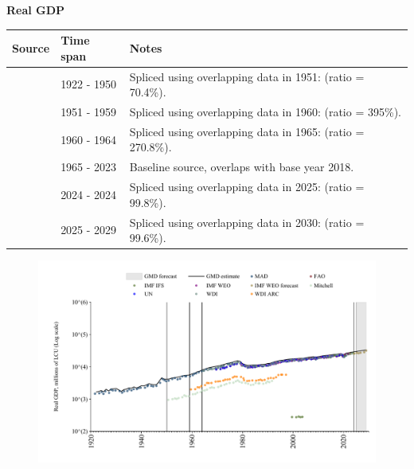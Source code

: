 \documentclass[12pt,a4paper,landscape]{article}
\begin{document}
\begin{adjustbox}{max totalsize={\paperwidth}{\paperheight},center}
\begin{minipage}[t][\textheight][t]{\textwidth}
\vspace*{0.5cm}
{}
\begin{center}
{\Large\bfseries Real GDP}
\end{center}
\vspace{0.5cm}
\begin{table}[H]
\centering
\small
\begin{tabular}{|l|l|l|}
\hline
\textbf{Source} & \textbf{Time span} & \textbf{Notes} \\
\hline
\rowcolor{white}\cite{MAD}& 1922 - 1950 &Spliced using overlapping data in 1951: (ratio = 70.4\%). \\
\rowcolor{lightgray}\cite{Mitchell}& 1951 - 1959 &Spliced using overlapping data in 1960: (ratio = 395\%). \\
\rowcolor{white}\cite{WDI_ARC}& 1960 - 1964 &Spliced using overlapping data in 1965: (ratio = 270.8\%). \\
\rowcolor{lightgray}\cite{WDI}& 1965 - 2023 &Baseline source, overlaps with base year 2018. \\
\rowcolor{white}\cite{IMF_IFS}& 2024 - 2024 &Spliced using overlapping data in 2025: (ratio = 99.8\%). \\
\rowcolor{lightgray}\cite{IMF_WEO_forecast}& 2025 - 2029 &Spliced using overlapping data in 2030: (ratio = 99.6\%). \\
\hline
\end{tabular}
\end{table}
\begin{figure}[H]
\centering
\includegraphics[width=\textwidth,height=0.6\textheight,keepaspectratio]{graphs/SLV_rGDP.pdf}
\end{figure}
\end{minipage}
\end{adjustbox}
\end{document}
